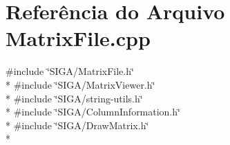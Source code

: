 \section{Referência do Arquivo Matrix\+File.\+cpp}
\label{_matrix_file_8cpp}
{\ttfamily \#include \char`\"{}S\+I\+G\+A/\+Matrix\+File.\+h\char`\"{}}\\*
{\ttfamily \#include \char`\"{}S\+I\+G\+A/\+Matrix\+Viewer.\+h\char`\"{}}\\*
{\ttfamily \#include \char`\"{}S\+I\+G\+A/string-\/utils.\+h\char`\"{}}\\*
{\ttfamily \#include \char`\"{}S\+I\+G\+A/\+Column\+Information.\+h\char`\"{}}\\*
{\ttfamily \#include \char`\"{}S\+I\+G\+A/\+Draw\+Matrix.\+h\char`\"{}}\\*
